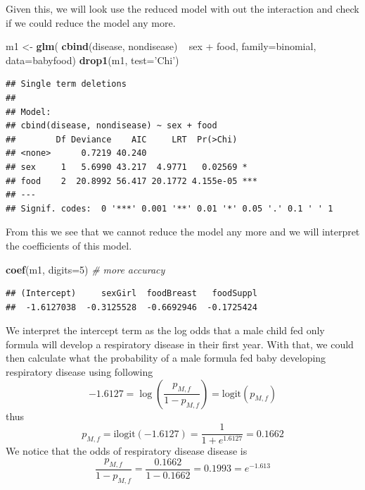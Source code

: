 \documentclass[]{book}
\newenvironment{Shaded}{\begin{snugshade}}{\end{snugshade}}
\newcommand{\KeywordTok}[1]{\textcolor[rgb]{0.13,0.29,0.53}{\textbf{{#1}}}}
\newcommand{\DataTypeTok}[1]{\textcolor[rgb]{0.13,0.29,0.53}{{#1}}}
\newcommand{\DecValTok}[1]{\textcolor[rgb]{0.00,0.00,0.81}{{#1}}}
\newcommand{\StringTok}[1]{\textcolor[rgb]{0.31,0.60,0.02}{{#1}}}
\newcommand{\CommentTok}[1]{\textcolor[rgb]{0.56,0.35,0.01}{\textit{{#1}}}}
\newcommand{\NormalTok}[1]{{#1}}
\theoremstyle{definition}
\theoremstyle{definition}
\theoremstyle{remark}
\begin{document}
Given this, we will look use the reduced model with out the interaction
and check if we could reduce the model any more.

\begin{Shaded}
\begin{Highlighting}[]
\NormalTok{m1 <-}\StringTok{ }\KeywordTok{glm}\NormalTok{( }\KeywordTok{cbind}\NormalTok{(disease, nondisease) ~}\StringTok{ }\NormalTok{sex +}\StringTok{ }\NormalTok{food, }\DataTypeTok{family=}\NormalTok{binomial, }\DataTypeTok{data=}\NormalTok{babyfood)}
\KeywordTok{drop1}\NormalTok{(m1, }\DataTypeTok{test=}\StringTok{'Chi'}\NormalTok{)}
\end{Highlighting}
\end{Shaded}

\begin{verbatim}
## Single term deletions
## 
## Model:
## cbind(disease, nondisease) ~ sex + food
##        Df Deviance    AIC     LRT  Pr(>Chi)    
## <none>      0.7219 40.240                      
## sex     1   5.6990 43.217  4.9771   0.02569 *  
## food    2  20.8992 56.417 20.1772 4.155e-05 ***
## ---
## Signif. codes:  0 '***' 0.001 '**' 0.01 '*' 0.05 '.' 0.1 ' ' 1
\end{verbatim}

From this we see that we cannot reduce the model any more and we will
interpret the coefficients of this model.

\begin{Shaded}
\begin{Highlighting}[]
\KeywordTok{coef}\NormalTok{(m1, }\DataTypeTok{digits=}\DecValTok{5}\NormalTok{)  }\CommentTok{# more accuracy}
\end{Highlighting}
\end{Shaded}

\begin{verbatim}
## (Intercept)     sexGirl  foodBreast   foodSuppl 
##  -1.6127038  -0.3125528  -0.6692946  -0.1725424
\end{verbatim}

We interpret the intercept term as the log odds that a male child fed
only formula will develop a respiratory disease in their first year.
With that, we could then calculate what the probability of a male
formula fed baby developing respiratory disease using following
\[-1.6127=\log\left(\frac{p_{M,f}}{1-p_{M,f}}\right)=\textrm{logit}\left(p_{M,f}\right)\]
thus
\[p_{M,f}=\textrm{ilogit}\left(-1.6127\right)=\frac{1}{1+e^{1.6127}}=0.1662\]
We notice that the odds of respiratory disease disease is
\[\frac{p_{M,f}}{1-p_{M,f}}=\frac{0.1662}{1-0.1662}=0.1993=e^{-1.613}\]
\end{document}
